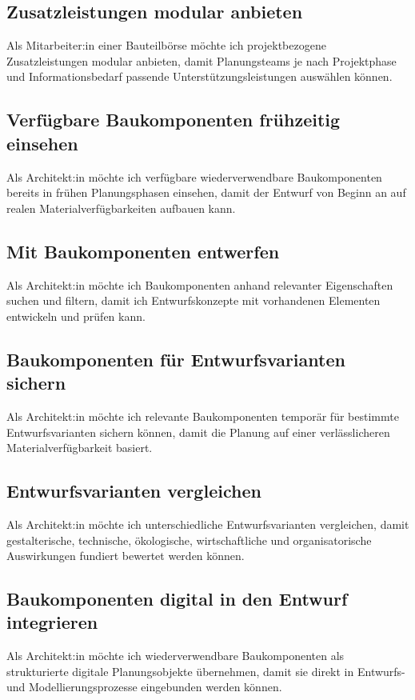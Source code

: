 \subsection{Zusatzleistungen modular anbieten}
\label{us:bb-10} Als Mitarbeiter:in einer Bauteilbörse möchte ich projektbezogene Zusatzleistungen modular anbieten, damit Planungsteams je nach Projektphase und Informationsbedarf passende Unterstützungsleistungen auswählen können.


\subsection{Verfügbare Baukomponenten frühzeitig einsehen}
\label{us:a-01} Als Architekt:in möchte ich verfügbare wiederverwendbare Baukomponenten bereits in frühen Planungsphasen einsehen, damit der Entwurf von Beginn an auf realen Materialverfügbarkeiten aufbauen kann.

\subsection{Mit Baukomponenten entwerfen}
\label{us:a-02} Als Architekt:in möchte ich Baukomponenten anhand relevanter Eigenschaften suchen und filtern, damit ich Entwurfskonzepte mit vorhandenen Elementen entwickeln und prüfen kann.

\subsection{Baukomponenten für Entwurfsvarianten sichern}
\label{us:a-03} Als Architekt:in möchte ich relevante Baukomponenten temporär für bestimmte Entwurfsvarianten sichern können, damit die Planung auf einer verlässlicheren Materialverfügbarkeit basiert.

\subsection{Entwurfsvarianten vergleichen}
\label{us:a-04} Als Architekt:in möchte ich unterschiedliche Entwurfsvarianten vergleichen, damit gestalterische, technische, ökologische, wirtschaftliche und organisatorische Auswirkungen fundiert bewertet werden können.

\subsection{Baukomponenten digital in den Entwurf integrieren}
\label{us:a-05} Als Architekt:in möchte ich wiederverwendbare Baukomponenten als strukturierte digitale Planungsobjekte übernehmen, damit sie direkt in Entwurfs- und Modellierungsprozesse eingebunden werden können.

